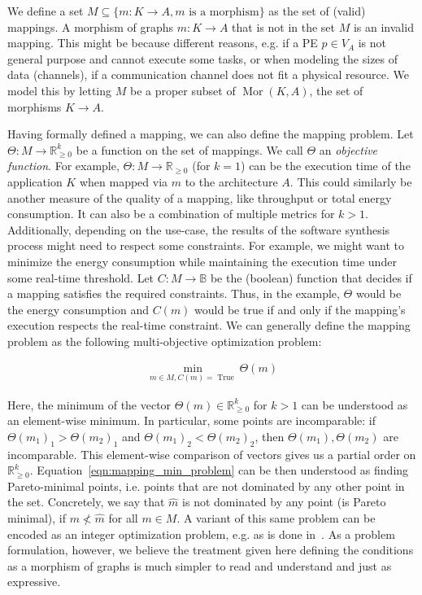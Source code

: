 We define a set $M \subseteq \{m : K \rightarrow A, m \text{ is a morphism} \}$ as the set of (valid) mappings. A morphism of graphs $m : K \rightarrow A$ that is not in the set $M$ is an invalid mapping.
This might be because different reasons, e.g. if a \ac{PE} $p \in V_A$ is not general purpose and cannot execute some tasks, or when modeling the sizes of data (channels), if a communication channel does not fit a physical resource.
We model this by letting $M$ be a proper subset of $\operatorname{Mor}(K,A)$, the set of morphisms $K \rightarrow A$.

Having formally defined a mapping, we can also define the mapping problem. Let $\Theta : M \rightarrow \mathbb{R}_{\geq 0}^k$  be a function on the set of mappings. We call $\Theta$ an \emph{objective function}.
For example, $\Theta: M \rightarrow \mathbb{R}_{\geq 0}$ (for $k = 1$) can be the execution time of the application $K$ when mapped via $m$ to the architecture $A$.
This could similarly be another measure of the quality of a mapping, like throughput or total energy consumption. It can also be a combination of multiple metrics for $k > 1$.
Additionally, depending on the use-case, the results of the software synthesis process might need to respect some constraints.
For example, we might want to minimize the energy consumption while maintaining the execution time under some real-time threshold.
Let $C : M \rightarrow \mathbb{B}$ be the (boolean) function that decides if a mapping satisfies the required constraints.
Thus, in the example, $\Theta$ would be the energy consumption and $C(m)$ would be true if and only if the mapping's execution respects the real-time constraint.
We can generally define the mapping problem as the following multi-objective optimization problem:

\begin{align}
  \label{eqn:mapping_min_problem}
  \min_{m \in M, C(m) = \operatorname{True}} \Theta(m)
\end{align}

Here, the minimum of the vector $\Theta(m) \in \mathbb{R}_{\geq 0}^k$ for $k > 1$ can be understood as an element-wise minimum. In particular, some points are incomparable: if $\Theta(m_1)_1 > \Theta(m_2)_1$ and $\Theta(m_1)_2 < \Theta(m_2)_2$, then $\Theta(m_1), \Theta(m_2)$ are incomparable.
This element-wise comparison of vectors gives us a partial order on $\mathbb{R}_{\geq 0}^k$.
Equation~\ref{eqn:mapping_min_problem} can be then understood as finding Pareto-minimal points, i.e. points that are not dominated by any other point in the set.
Concretely, we say that $\hat m$ is not dominated by any point (is Pareto minimal), if $m \nless \hat m$ for all $m \in M$. 
A variant of this same problem can be encoded as an integer optimization problem, e.g. as is done in~\cite{erbas2006multiobjective}.
As a problem formulation, however, we believe the treatment given here defining the conditions as a morphism of graphs is much simpler to read and understand and just as expressive.

